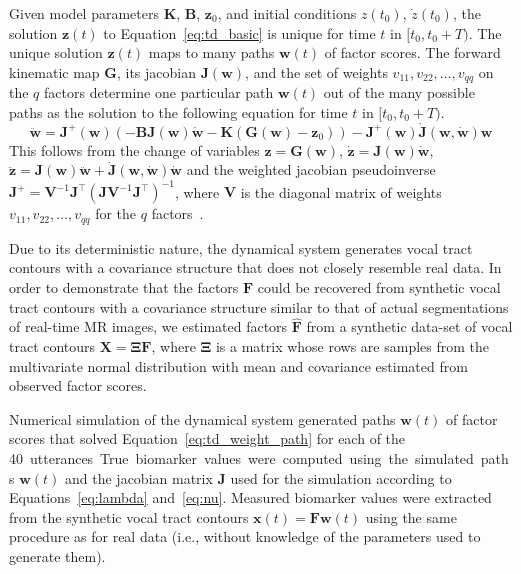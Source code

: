\documentclass[preprint]{JASAnew}\usepackage[]{graphicx}\usepackage[]{color}
\begin{document}
Given model parameters $\mathbf{K}$, $\mathbf{B}$, $\mathbf{z}_0$, and initial conditions $z(t_0)$, $\dot{z}(t_0)$, the solution $\mathbf{z}(t)$ to Equation~\ref{eq:td_basic} is unique for time $t$ in $[t_0,t_0+T)$. The unique solution $\mathbf{z}(t)$ maps to many paths $\mathbf{w}(t)$ of factor scores. The forward kinematic map $\mathbf{G}$, its jacobian $\mathbf{J}(\mathbf{w})$, and the set of weights $v_{11}, v_{22}, \ldots, v_{qq}$ on the $q$ factors determine one particular path $\mathbf{w}(t)$ out of the many possible paths as the solution to the following equation for time $t$ in $[t_0, t_0+T)$.
\begin{equation}
\label{eq:td_weight_path}
\mathbf{\ddot{w}} = \mathbf{J}^+(\mathbf{w}) (-\mathbf{B}\mathbf{J}(\mathbf{w})\mathbf{\dot{w}} - \mathbf{K}(\mathbf{G}(\mathbf{w})-\mathbf{z}_0)) - \mathbf{J}^+(\mathbf{w})\mathbf{\dot{J}}(\mathbf{w},\mathbf{\dot{w}})\mathbf{w}
\end{equation}
This follows from the change of variables $\mathbf{z} = \mathbf{G}(\mathbf{w})$, $\mathbf{\dot{z}} = \mathbf{J}(\mathbf{w})\mathbf{\dot{w}}$, $\mathbf{\ddot{z}} = \mathbf{J}(\mathbf{w})\mathbf{\ddot{w}} + \mathbf{\dot{J}}(\mathbf{w},\mathbf{\dot{w}})\mathbf{\dot{w}}$ and the weighted jacobian pseudoinverse $\mathbf{J}^+ = \mathbf{V}^{-1}\mathbf{J}^\intercal (\mathbf{J}\mathbf{V}^{-1}\mathbf{J}^\intercal)^{-1}$, where $\mathbf{V}$ is the diagonal matrix of weights $v_{11}, v_{22}, \ldots, v_{qq}$ for the $q$ factors~\citep{saltzman1989dynamical}. 

Due to its deterministic nature, the dynamical system generates vocal tract contours with a covariance structure that does not closely resemble real data. In order to demonstrate that the factors $\mathbf{F}$ could be recovered from synthetic vocal tract contours with a covariance structure similar to that of actual segmentations of real-time MR images, we estimated factors $\mathbf{\hat{F}}$ from a synthetic data-set of vocal tract contours $\mathbf{X} = \boldsymbol{\Xi}\mathbf{F}$, where $\boldsymbol{\Xi}$ is a matrix whose rows are samples from the multivariate normal distribution with mean and covariance estimated from observed factor scores. 

Numerical simulation of the dynamical system generated paths $\mathbf{w}(t)$ of factor scores that solved Equation~\ref{eq:td_weight_path} for each of the \SI{40} utterances. True biomarker values were computed using the simulated paths $\mathbf{w}(t)$ and the jacobian matrix $\mathbf{J}$ used for the simulation according to Equations~\ref{eq:lambda} and~\ref{eq:nu}. Measured biomarker values were extracted from the synthetic vocal tract contours $\mathbf{x}(t) = \mathbf{F}\mathbf{w}(t)$ using the same procedure as for real data (i.e., without knowledge of the parameters used to generate them). 
\end{document}
